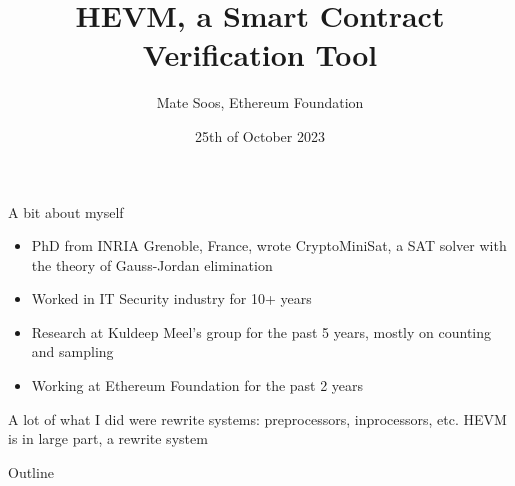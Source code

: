 \documentclass[aspectratio=169]{beamer}
\title{HEVM, a Smart Contract Verification Tool}
\author{Mate Soos, Ethereum Foundation}
\date{25th of October 2023}
\begin{document}
\begin{frame}
    \titlepage 
\end{frame}

\begin{frame}{A bit about myself}
\begin{itemize}
\item PhD from INRIA Grenoble, France, wrote CryptoMiniSat, a SAT solver with the theory of Gauss-Jordan elimination
\item Worked in IT Security industry for 10+ years
\item Research at Kuldeep Meel's group for the past 5 years, mostly on counting and sampling
\item Working at Ethereum Foundation for the past 2 years
\end{itemize}
\bigskip

A lot of what I did were rewrite systems: preprocessors, inprocessors, etc. HEVM is in large part, a rewrite system

\end{frame}

\begin{frame}{Outline}
    \tableofcontents
\end{frame}


\end{document}
